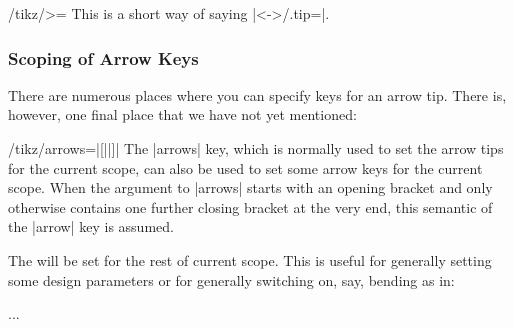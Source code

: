 \begin{key}{/tikz/>=}
  This is a short way of saying |<->/.tip=|. 
\begin{codeexample}[]
\begin{tikzpicture}[scale=2,ultra thick]
  \begin{scope}[>=Latex]
    \draw[>->]    (0pt,3ex) -- (1cm,3ex);
    \draw[|<->>|] (0pt,2ex) -- (1cm,2ex);
  \end{scope}
  \begin{scope}[>=Stealth]
    \draw[>->]    (0pt,1ex) -- (1cm,1ex);
    \draw[|<<.<->|] (0pt,0ex) -- (1cm,0ex);
  \end{scope}
\end{tikzpicture}
\end{codeexample}

\end{key}



\subsubsection{Scoping of Arrow Keys}
\label{section-arrow-scopes}

There are numerous places where you can specify keys for an arrow
tip. There is, however, one final place that we have not yet
mentioned:

\begin{key}{/tikz/arrows=|[||]|}
  The |arrows| key, which is normally used to set the arrow tips for
  the current scope, can also be used to set some arrow keys for the
  current scope. When the argument to |arrows| starts with an opening
  bracket and only otherwise contains one further closing bracket at
  the very end, this semantic of the |arrow| key is assumed.

  The  will be set for the rest of current
  scope. This is useful for generally setting some design parameters
  or for generally switching on, say, bending as in:
\begin{codeexample}
\tikz [arrows={[bend]}] ... %
\end{codeexample}
\end{key}

